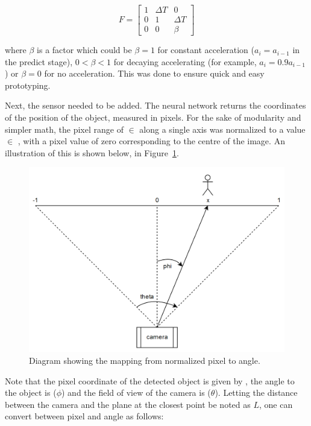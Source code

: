 \[ F = \begin{bmatrix} 1 & \Delta T & 0 \\
                       0 & 1 & \Delta T \\
					   0 & 0 & \beta
		\end{bmatrix} \]

where $\beta$ is a factor which could be $\beta = 1$ for constant acceleration ($a_i = a_{i-1}$ in the predict stage), $0 < \beta < 1$ for decaying accelerating (for example, $a_i = 0.9 a_{i-1}$) or $\beta = 0$ for no acceleration. This was done to ensure quick and easy prototyping.

Next, the sensor needed to be added. The neural network returns the coordinates of the position of the object, measured in pixels. For the sake of modularity and simpler math, the pixel range of  $\in$ \pyth{[0, 299]} along a single axis was normalized to a value  $\in$ \pyth{[-1, 1]}, with a pixel value of zero corresponding to the centre of the image. An illustration of this is shown below, in Figure~\ref{fig:pixel_to_angle}.

\begin{figure}[h!]
  \centering
  \includegraphics[width=\textwidth]{methodology/pixel_to_angle2}
  \caption{\label{fig:pixel_to_angle} Diagram showing the mapping from normalized pixel to angle.}
\end{figure}

Note that the pixel coordinate of the detected object is given by , the angle to the object is  ($\phi$) and the field of view of the camera is  ($\theta$). Letting the distance between the camera and the plane at the closest point be noted as $L$, one can convert between pixel and angle as follows:

